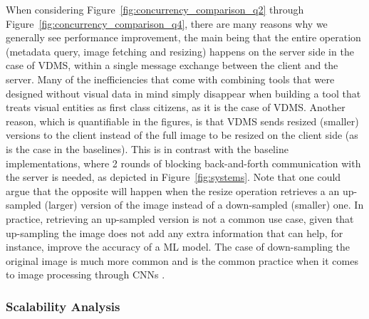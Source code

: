 When considering Figure~\ref{fig:concurrency_comparison_q2}
through Figure~\ref{fig:concurrency_comparison_q4},
there are many reasons why we generally see performance improvement, the main being
that the entire operation (metadata query, image fetching and resizing) happens
on the server side in the case of VDMS, within a single message
exchange between the client and the server.
Many of the inefficiencies that come with combining tools that were designed
without visual data in mind simply disappear when building a tool that treats
visual entities as first class citizens, as it is the case of VDMS.
Another reason, which is quantifiable in the figures, is that
VDMS sends resized (smaller) versions to the client instead of the full image
to be resized on the client side (as is the case in the baselines).
This is in contrast with the baseline implementations,
where 2 rounds of blocking back-and-forth communication with the server is needed,
as depicted in Figure~\ref{fig:systems}.
Note that one could argue that the opposite will happen
when the resize operation retrieves a an up-sampled (larger) version of the image
instead of a down-sampled (smaller) one.
In practice, retrieving an up-sampled version is not a common use case,
given that up-sampling the image does not add any extra information that can help,
for instance, improve the accuracy of a ML model.
The case of down-sampling the original image is much more common and is the common
practice when it comes to image processing through CNNs \cite{cnn,resnet}.




\subsubsection{Scalability Analysis}


